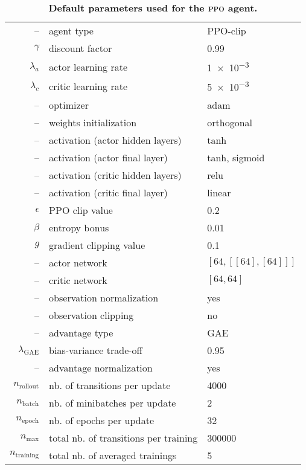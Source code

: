 

\begin{table}
    \footnotesize
    \caption{\textbf{Default parameters used for the \textsc{ppo} agent.}}
    \label{table:shkadov_parameters}
    \centering
    \begin{tabular}{rll}
        \toprule
        --					& agent type					& PPO-clip\\
	$\gamma$ 			& discount factor				& 0.99\\
	$\lambda_a$ 			& actor learning rate				& \num{1e-3}\\
	$\lambda_c$ 			& critic learning rate				& \num{5e-3}\\
	--		 			& optimizer					& adam\\
	--					& weights initialization			& orthogonal\\
	--	 				& activation (actor hidden layers)	& tanh\\
	-- 					& activation (actor final layer)		& tanh, sigmoid\\
	--	 				& activation (critic hidden layers)	& relu\\
	-- 					& activation (critic final layer)		& linear\\
	$\epsilon$ 			& PPO clip value				& 0.2\\
	$\beta$				& entropy bonus				& 0.01\\
	$g$					& gradient clipping value			& 0.1\\	
	-- 					& actor network					& $[64, [[64],[64]]]$\\
	-- 					& critic network					& $[64, 64]$\\
	--					& observation normalization		& yes\\
	--					& observation clipping			& no\\
	--					& advantage type				& GAE\\
	$\lambda_\text{GAE}$	& bias-variance trade-off			& 0.95\\
	--					& advantage normalization		& yes\\\midrule
	$n_\text{rollout}$ 		& nb. of transitions per update		& 4000\\
	$n_\text{batch}$ 		& nb. of minibatches per update 	& 2\\
	$n_\text{epoch}$		& nb. of epochs per update		& 32\\
	$n_\text{max}$			& total nb. of transitions per training	& \num{300000}\\
	$n_\text{training}$		& total nb. of averaged trainings	& 5\\\midrule
        \bottomrule
    \end{tabular}
\end{table}
